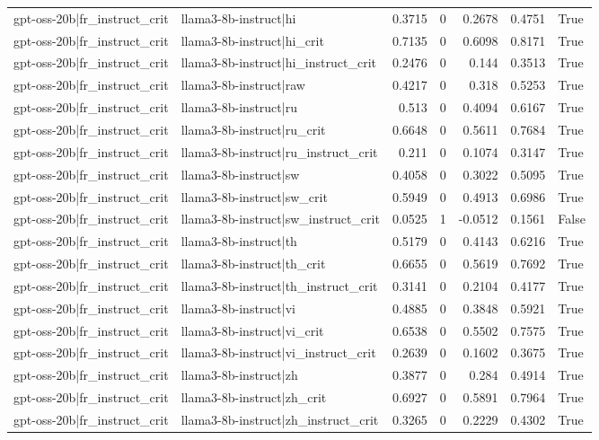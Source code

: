 \begin{table}
\begin{tabular}{l l r r r r l}
gpt-oss-20b|fr_instruct_crit & llama3-8b-instruct|hi & 0.3715 & 0 & 0.2678 & 0.4751 & True \\
gpt-oss-20b|fr_instruct_crit & llama3-8b-instruct|hi_crit & 0.7135 & 0 & 0.6098 & 0.8171 & True \\
gpt-oss-20b|fr_instruct_crit & llama3-8b-instruct|hi_instruct_crit & 0.2476 & 0 & 0.144 & 0.3513 & True \\
gpt-oss-20b|fr_instruct_crit & llama3-8b-instruct|raw & 0.4217 & 0 & 0.318 & 0.5253 & True \\
gpt-oss-20b|fr_instruct_crit & llama3-8b-instruct|ru & 0.513 & 0 & 0.4094 & 0.6167 & True \\
gpt-oss-20b|fr_instruct_crit & llama3-8b-instruct|ru_crit & 0.6648 & 0 & 0.5611 & 0.7684 & True \\
gpt-oss-20b|fr_instruct_crit & llama3-8b-instruct|ru_instruct_crit & 0.211 & 0 & 0.1074 & 0.3147 & True \\
gpt-oss-20b|fr_instruct_crit & llama3-8b-instruct|sw & 0.4058 & 0 & 0.3022 & 0.5095 & True \\
gpt-oss-20b|fr_instruct_crit & llama3-8b-instruct|sw_crit & 0.5949 & 0 & 0.4913 & 0.6986 & True \\
gpt-oss-20b|fr_instruct_crit & llama3-8b-instruct|sw_instruct_crit & 0.0525 & 1 & -0.0512 & 0.1561 & False \\
gpt-oss-20b|fr_instruct_crit & llama3-8b-instruct|th & 0.5179 & 0 & 0.4143 & 0.6216 & True \\
gpt-oss-20b|fr_instruct_crit & llama3-8b-instruct|th_crit & 0.6655 & 0 & 0.5619 & 0.7692 & True \\
gpt-oss-20b|fr_instruct_crit & llama3-8b-instruct|th_instruct_crit & 0.3141 & 0 & 0.2104 & 0.4177 & True \\
gpt-oss-20b|fr_instruct_crit & llama3-8b-instruct|vi & 0.4885 & 0 & 0.3848 & 0.5921 & True \\
gpt-oss-20b|fr_instruct_crit & llama3-8b-instruct|vi_crit & 0.6538 & 0 & 0.5502 & 0.7575 & True \\
gpt-oss-20b|fr_instruct_crit & llama3-8b-instruct|vi_instruct_crit & 0.2639 & 0 & 0.1602 & 0.3675 & True \\
gpt-oss-20b|fr_instruct_crit & llama3-8b-instruct|zh & 0.3877 & 0 & 0.284 & 0.4914 & True \\
gpt-oss-20b|fr_instruct_crit & llama3-8b-instruct|zh_crit & 0.6927 & 0 & 0.5891 & 0.7964 & True \\
gpt-oss-20b|fr_instruct_crit & llama3-8b-instruct|zh_instruct_crit & 0.3265 & 0 & 0.2229 & 0.4302 & True \\

\end{tabular}
\end{table}
